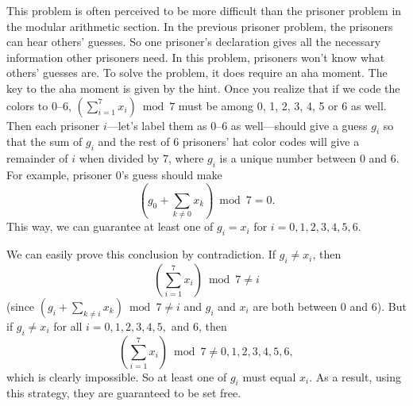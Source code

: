 \begin{solution}
This problem is often perceived to be more difficult than the prisoner problem in the modular arithmetic section. In the previous prisoner problem, the prisoners can hear others' guesses. So one prisoner's declaration gives all the necessary information other prisoners need. In this problem, prisoners won't know what others' guesses are. To solve the problem, it does require an aha moment. The key to the aha moment is given by the hint. Once you realize that if we code the colors to 0--6, $\displaystyle\left(\sum_{i=1}^{7}x_i\right)\bmod 7$ must be among 0, 1, 2, 3, 4, 5 or 6 as well. Then each prisoner $i$---let's label them as 0--6 as well---should give a guess $g_i$ so that the sum of $g_i$ and the rest of 6 prisoners' hat color codes will give a remainder of $i$ when divided by 7, where $g_i$ is a unique number between 0 and 6. For example, prisoner 0's guess should make
\[
\left(g_0+\sum_{k\ne0}x_k\right)\bmod 7=0.
\]
This way, we can guarantee at least one of $g_i=x_i$ for $i=0,1,2,3,4,5,6$.

We can easily prove this conclusion by contradiction. If $g_i\ne x_i$, then
\[
\displaystyle\left(\sum_{i=1}^{7}x_i\right)\bmod 7\ne i
\]
(since $\left(g_i+\displaystyle\sum_{k\ne i}x_k\right)\bmod 7\ne i$ and $g_i$ and $x_i$ are both between 0 and 6). But if $g_i\ne x_i$ for all $i=0,1,2,3,4,5,$ and 6, then
\[
\displaystyle\left(\sum_{i=1}^{7}x_i\right)\bmod 7\ne 0,1,2,3,4,5,6,
\]
which is clearly impossible. So at least one of $g_i$ must equal $x_i$. As a result, using this strategy, they are guaranteed to be set free.
\end{solution}

